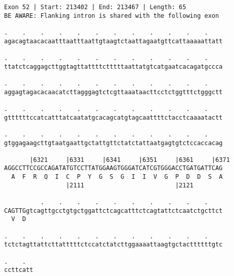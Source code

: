 \documentclass{article}
\begin{document}
\newpage
\begin{Verbatim}[fontfamily=courier]
Exon 52 | Start: 213402 | End: 213467 | Length: 65
BE AWARE: Flanking intron is shared with the following exon

.    .    .    .    .    .    .    .    .    .    .    .    
agacagtaacacaatttaatttaattgtaagtctaattagaatgttcattaaaaattatt

.    .    .    .    .    .    .    .    .    .    .    .    
ttatctcaggagcttggtagttattttctttttaattatgtcatgaatcacagatgccca

.    .    .    .    .    .    .    .    .    .    .    .    
aggagtagacacaacatcttagggagtctcgttaaataacttcctctggtttctgggctt

.    .    .    .    .    .    .    .    .    .    .    .    
gttttttccatcatttatcaatatgcacagcatgtagcaattttctacctcaaaatactt

.    .    .    .    .    .    .    .    .    .    .    .    
gtggagaagcttgtaatgaattgctattgttctatctattaatgagtgtctccaccacag

       |6321     |6331     |6341     |6351     |6361     |6371
AGGCCTTCCGCCAGATATGTCCTTATGGAAGTGGGATCATCGTGGGACCTGATGATTCAG
  A  F  R  Q  I  C  P  Y  G  S  G  I  I  V  G  P  D  D  S  A
                 |2111                         |2121        

          .    .    .    .    .    .    .    .    .    .    
CAGTTGgtcagttgcctgtgctggattctcagcatttctcagtattctcaatctgcttct
  V  D                                                      

.    .    .    .    .    .    .    .    .    .    .    .    
tctctagttattcttatttttctccatctatcttggaaaattaagtgctacttttttgtc

.    .  
ccttcatt
\end{Verbatim}
\newpage
\end{document}
